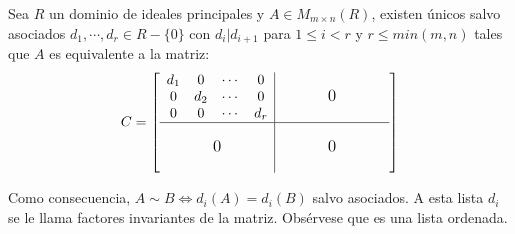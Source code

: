 \begin{theorem}
Sea $R$ un dominio de ideales principales y $A \in M_{m \times n}(R)$, existen únicos salvo asociados $d_1,\cdots,d_r \in R - \{0\}$  con $d_i | d_{i+1}$ para $1 \leq i < r$ y $r \leq min(m,n)$ tales que $A$ es equivalente a la matriz: \[
\sbox0{$\begin{matrix}d_ 1 & 0 & \cdots & 0 \\ 0 & d_2 & \cdots & 0 \\ 0 & 0 & \cdots & d_r \end{matrix}$}
%
C=\left[
\begin{array}{c|c}
\usebox{0}&\makebox[\wd0]{\large $0$}\\
\hline
  \vphantom{\usebox{0}}\makebox[\wd0]{\large $0$}&\makebox[\wd0]{\large $0$}
\end{array}
\right]
\]

Como consecuencia, $A \sim B \iff d_i(A) = d_i(B)$ salvo asociados. A esta lista $d_i$ se le llama factores invariantes de la matriz. Obsérvese que es una lista ordenada.
\end{theorem}
